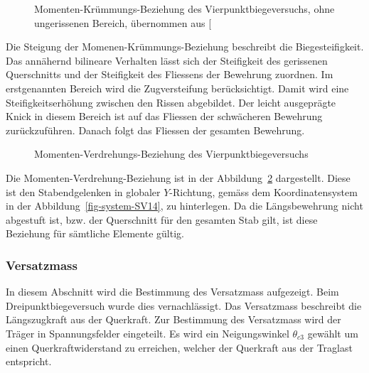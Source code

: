 \documentclass[
  11pt,
  letterpaper,
]{scrreprt}
\begin{document}
\begin{figure}[H]


\caption{\label{fig-mchi_sv14}Momenten-Krümmungs-Beziehung des
Vierpunktbiegeversuchs, ohne ungerissenen Bereich, übernommen aus
{[}\citeproc{ref-gitz_ansatze_2024}{1}{]}}

\end{figure}%

Die Steigung der Momenen-Krümmungs-Beziehung beschreibt die
Biegesteifigkeit. Das annähernd bilineare Verhalten lässt sich der
Steifigkeit des gerissenen Querschnitts und der Steifigkeit des
Fliessens der Bewehrung zuordnen. Im erstgenannten Bereich wird die
Zugversteifung berücksichtigt. Damit wird eine Steifigkeitserhöhung
zwischen den Rissen abgebildet. Der leicht ausgeprägte Knick in diesem
Bereich ist auf das Fliessen der schwächeren Bewehrung zurückzuführen.
Danach folgt das Fliessen der gesamten Bewehrung.

\begin{figure}[H]


\caption{\label{fig-mphi_sv14}Momenten-Verdrehungs-Beziehung des
Vierpunktbiegeversuchs}

\end{figure}%

Die Momenten-Verdrehung-Beziehung ist in der
Abbildung~\ref{fig-mphi_sv14} dargestellt. Diese ist den Stabendgelenken
in globaler \(Y\)-Richtung, gemäss dem Koordinatensystem in der
Abbildung~\ref{fig-system-SV14}, zu hinterlegen. Da die Längsbewehrung
nicht abgestuft ist, bzw. der Querschnitt für den gesamten Stab gilt,
ist diese Beziehung für sämtliche Elemente gültig.

\subsubsection{Versatzmass}\label{versatzmass}

In diesem Abschnitt wird die Bestimmung des Versatzmass aufgezeigt. Beim
Dreipunktbiegeversuch wurde dies vernachlässigt. Das Versatzmass
beschreibt die Längszugkraft aus der Querkraft. Zur Bestimmung des
Versatzmass wird der Träger in Spannungsfelder eingeteilt. Es wird ein
Neigungswinkel \(\theta_{c3}\) gewählt um einen Querkraftwiderstand zu
erreichen, welcher der Querkraft aus der Traglast entspricht.
\end{document}
